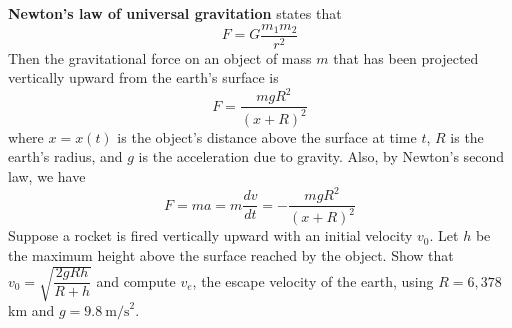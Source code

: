 \begin{problem}
    \textbf{Newton's law of universal gravitation} states that
    \[F=G\frac{m_1m_2}{r^2}\]
    Then the gravitational force on an object of mass \(m\) that has been
    projected vertically upward from the earth's surface is
    \[F=\frac{mgR^2}{(x+R)^2}\] where \(x=x(t)\) is the object's distance
    above the surface at time \(t\), \(R\) is the
    earth's radius, and \(g\) is the acceleration due to gravity.
    Also, by Newton's second law, we have
    \[F=ma=m\frac{dv}{dt}=-\frac{mgR^2}{(x+R)^2}\]
    Suppose a rocket is fired vertically upward with an initial velocity \(v_0\).
    Let \(h\) be the maximum height above the surface reached by the object.
    Show that \(v_0=\sqrt{\dfrac{2gRh}{R+h}}\) and compute \(v_e\), the escape
    velocity of the earth, using \(R=6,378\) km and \(g=9.8\ \text{m/s}^2\).
\end{problem}